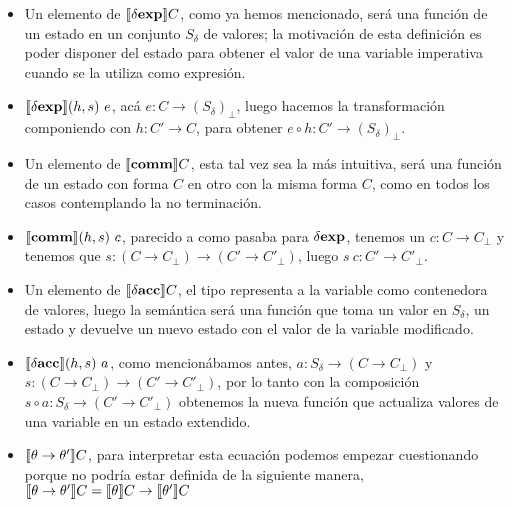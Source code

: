 \begin{itemize}
\item Un elemento de $\llbracket \delta \textbf{exp} \rrbracket C$, como ya hemos mencionado, ser\'a una funci\'on 
de un estado en un conjunto $S_\delta$ de valores; la motivaci\'on de 
esta definici\'on es poder disponer del estado para obtener el valor de 
una variable imperativa cuando se la utiliza como expresi\'on.

\item $\llbracket \delta \textbf{exp} \rrbracket(h,s) \ e$, acá $e : C \rightarrow (S_\delta)_{\bot}$, luego
hacemos la transformaci\'on componiendo con $h : C' \rightarrow C$, para obtener
$e \circ h : C' \rightarrow (S_\delta)_{\bot}$.

\item Un elemento de $\llbracket \textbf{comm} \rrbracket C$, esta tal vez sea la m\'as intuitiva, ser\'a
una funci\'on de un estado con forma $C$ en otro con la misma forma $C$,
como en todos los casos contemplando la no terminaci\'on.

\item $\llbracket \textbf{comm} \rrbracket(h,s) \ c$, parecido a como pasaba para $\delta \textbf{exp}$,
tenemos un $c : C \rightarrow C_\bot$ y tenemos que 
$s : (C \rightarrow C_\bot) \rightarrow (C' \rightarrow C'_\bot)$, luego
$s \ c : C' \rightarrow C'_\bot$.

\item Un elemento de $\llbracket \delta \textbf{acc} \rrbracket C$, el tipo representa a la variable como contenedora
de valores, luego la sem\'antica ser\'a una funci\'on que toma un valor en $S_\delta$,
un estado y devuelve un nuevo estado con el valor de la variable modificado.

\item $\llbracket \delta \textbf{acc} \rrbracket(h,s) \ a$, como mencion\'abamos antes, 
$a : S_\delta \rightarrow (C \rightarrow C_\bot)$ y
$s : (C \rightarrow C_\bot) \rightarrow (C' \rightarrow C'_\bot)$, por lo tanto
con la composici\'on $s \circ a : S_\delta \rightarrow (C' \rightarrow C'_\bot)$
obtenemos la nueva funci\'on que actualiza valores de una variable en un estado
extendido.

\item $\llbracket \theta \rightarrow \theta' \rrbracket C$, para interpretar esta ecuaci\'on
podemos empezar cuestionando porque no podr\'ia estar definida de la siguiente 
manera,\\

$\llbracket \theta \rightarrow \theta' \rrbracket C = \llbracket \theta \rrbracket C \rightarrow \llbracket \theta' \rrbracket C$\\


\end{itemize}
